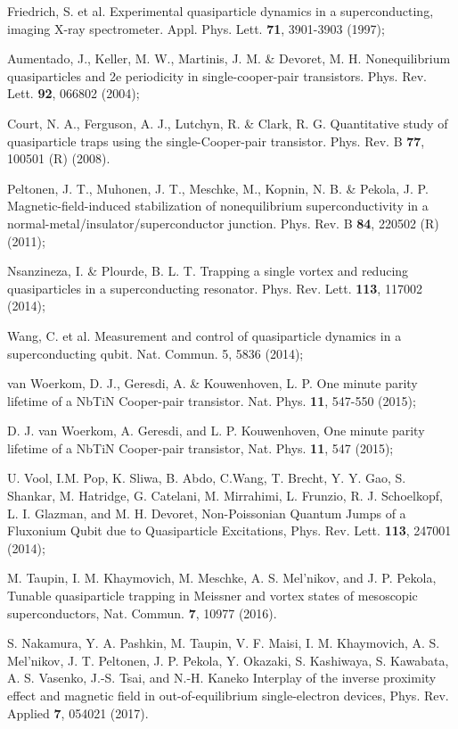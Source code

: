 \documentclass[prx,twocolumn,aps,superscriptaddress,showpacs,amsmath,amssymb,footnoteinbib]{revtex4-1}
\begin{document}
\begin{thebibliography}{99}
Friedrich, S. et al. Experimental quasiparticle dynamics in a
superconducting, imaging X-ray spectrometer. Appl. Phys. Lett.
\textbf{71}, 3901-3903 (1997); %

Aumentado, J., Keller, M. W., Martinis, J. M. \& Devoret, M. H.
Nonequilibrium quasiparticles and 2e periodicity in
single-cooper-pair transistors. Phys. Rev. Lett. \textbf{92},
066802 (2004); %

Court, N. A., Ferguson, A. J., Lutchyn, R. \& Clark, R. G.
Quantitative study of quasiparticle traps using the
single-Cooper-pair transistor. Phys. Rev. B \textbf{77}, 100501
(R) (2008).

Peltonen, J. T., Muhonen, J. T., Meschke, M., Kopnin, N. B. \&
Pekola, J. P. Magnetic-field-induced stabilization of
nonequilibrium superconductivity in a
normal-metal/insulator/superconductor junction. Phys. Rev. B
\textbf{84}, 220502 (R) (2011); %

Nsanzineza, I. \& Plourde, B. L. T. Trapping a single vortex and
reducing quasiparticles in a superconducting resonator. Phys. Rev.
Lett. \textbf{113}, 117002 (2014); %

Wang, C. et al. Measurement and control of quasiparticle dynamics
in a superconducting qubit. Nat. Commun. 5, 5836 (2014); %

van Woerkom, D. J., Geresdi, A. \& Kouwenhoven, L. P. One minute
parity lifetime of a NbTiN Cooper-pair transistor. Nat. Phys.
\textbf{11}, 547-550 (2015); %

D. J. van Woerkom, A. Geresdi, and L. P. Kouwenhoven, One minute
parity lifetime of a NbTiN Cooper-pair transistor, Nat. Phys.
\textbf{11}, 547 (2015); %

U. Vool, I.M. Pop, K. Sliwa, B. Abdo, C.Wang, T. Brecht, Y. Y.
Gao, S. Shankar, M. Hatridge, G. Catelani, M. Mirrahimi, L.
Frunzio, R. J. Schoelkopf, L. I. Glazman, and M. H. Devoret,
Non-Poissonian Quantum Jumps of a Fluxonium Qubit due to
Quasiparticle Excitations,
Phys. Rev. Lett. \textbf{113}, 247001 (2014); %

 M. Taupin, I. M. Khaymovich, M. Meschke,
A. S. Mel'nikov, and J. P. Pekola, Tunable quasiparticle trapping
in Meissner and vortex states of mesoscopic superconductors, Nat.
Commun. \textbf{7}, 10977 (2016). %

S. Nakamura, Y. A. Pashkin, M. Taupin, V. F. Maisi, I. M.
Khaymovich, A. S. Mel'nikov, J. T. Peltonen, J. P. Pekola, Y.
Okazaki, S. Kashiwaya, S. Kawabata, A. S. Vasenko, J.-S. Tsai, and
N.-H. Kaneko Interplay of the inverse proximity effect and
magnetic field in out-of-equilibrium single-electron devices,
Phys. Rev. Applied {\bf 7}, 054021 (2017).


\end{thebibliography}
\end{document}
